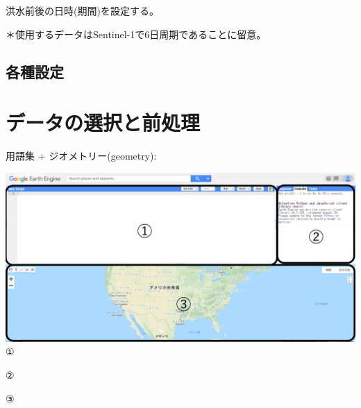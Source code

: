 \documentclass[
]{book}
\begin{document}
洪水前後の日時(期間)を設定する。　　

＊使用するデータはSentinel-1で6日周期であることに留意。

\hypertarget{ux5404ux7a2eux8a2dux5b9a}{%
\section{各種設定}\label{ux5404ux7a2eux8a2dux5b9a}}

\hypertarget{ux30c7ux30fcux30bfux306eux9078ux629eux3068ux524dux51e6ux7406}{%
\chapter{データの選択と前処理}\label{ux30c7ux30fcux30bfux306eux9078ux629eux3068ux524dux51e6ux7406}}

用語集
+ ジオメトリー(geometry):

\includegraphics{images/GEE.png}
①

②

③
\end{document}
